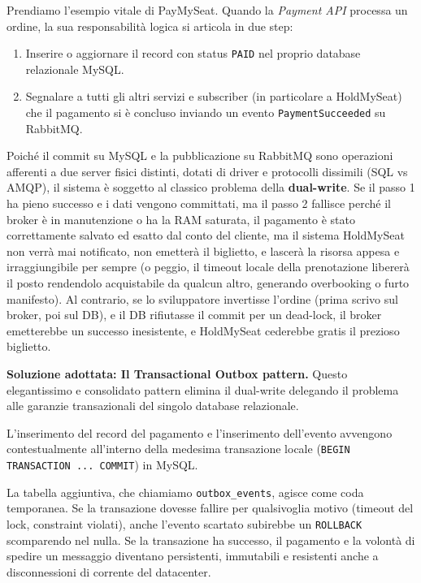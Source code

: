 \documentclass[11pt,a4paper]{report}
\begin{document}
Prendiamo l'esempio vitale di PayMySeat. Quando la \textit{Payment API} processa un ordine, la sua responsabilit\`a logica si articola in due step:
\begin{enumerate}
    \item Inserire o aggiornare il record con status \texttt{PAID} nel proprio database relazionale MySQL.
    \item Segnalare a tutti gli altri servizi e subscriber (in particolare a HoldMySeat) che il pagamento si \`e concluso inviando un evento \texttt{PaymentSucceeded} su RabbitMQ.
\end{enumerate}

Poich\'e il commit su MySQL e la pubblicazione su RabbitMQ sono operazioni afferenti a due server fisici distinti, dotati di driver e protocolli dissimili (SQL vs AMQP), il sistema \`e soggetto al classico problema della \textbf{dual-write}.
Se il passo 1 ha pieno successo e i dati vengono committati, ma il passo 2 fallisce perch\'e il broker \`e in manutenzione o ha la RAM saturata, il pagamento \`e stato correttamente salvato ed esatto dal conto del cliente, ma il sistema HoldMySeat non verr\`a mai notificato, non emetter\`a il biglietto, e lascer\`a la risorsa appesa e irraggiungibile per sempre (o peggio, il timeout locale della prenotazione liberer\`a il posto rendendolo acquistabile da qualcun altro, generando overbooking o furto manifesto).
Al contrario, se lo sviluppatore invertisse l'ordine (prima scrivo sul broker, poi sul DB), e il DB rifiutasse il commit per un dead-lock, il broker emetterebbe un successo inesistente, e HoldMySeat cederebbe gratis il prezioso biglietto.

\textbf{Soluzione adottata: Il Transactional Outbox pattern.}
Questo elegantissimo e consolidato pattern elimina il dual-write delegando il problema alle garanzie transazionali del singolo database relazionale.

L'inserimento del record del pagamento e l'inserimento dell'evento avvengono contestualmente all'interno della medesima transazione locale (\texttt{BEGIN TRANSACTION ... COMMIT}) in MySQL. 

La tabella aggiuntiva, che chiamiamo \texttt{outbox\_events}, agisce come coda temporanea.
Se la transazione dovesse fallire per qualsivoglia motivo (timeout del lock, constraint violati), anche l'evento scartato subirebbe un \texttt{ROLLBACK} scomparendo nel nulla. Se la transazione ha successo, il pagamento e la volont\`a di spedire un messaggio diventano persistenti, immutabili e resistenti anche a disconnessioni di corrente del datacenter.
\end{document}
